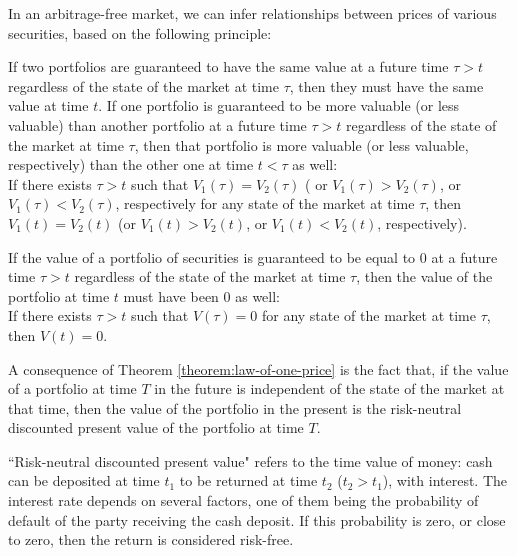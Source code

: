 In an arbitrage-free market, we can infer relationships between prices of
    various securities, based on the following principle:
\begin{theorem}
    \label{theorem:law-of-one-price}
    If two portfolios are guaranteed to have the same value at a future time
        $ \tau > t $ regardless of the state of the market at time $ \tau $,
        then they must have the same value at time $ t $.
    If one portfolio is guaranteed to be more valuable (or less valuable) than
        another portfolio at a future time $ \tau > t $ regardless of the state
        of the market at time $ \tau $, then that portfolio is more valuable
        (or less valuable, respectively) than the other one at time $ t < \tau $
        as well: \\
    If there exists $ \tau > t $ such that $ V_1(\tau) = V_2(\tau) $ ( or
        $ V_1(\tau) > V_2(\tau) $, or $ V_1(\tau) < V_2(\tau) $, respectively
        for any state of the market at time $ \tau $, then $ V_1(t) = V_2(t) $
        (or $ V_1(t) > V_2(t) $, or $ V_1(t) < V_2(t) $, respectively).
\end{theorem}

\begin{corollary}
    If the value of a portfolio of securities is guaranteed to be equal to
        0 at a future time $ \tau > t $ regardless of the state of the market
        at time $ \tau $, then the value of the portfolio at time $ t $ must
        have been 0 as well: \\
    If there exists $ \tau > t $ such that $ V(\tau) = 0 $ for any state of the
        market at time $ \tau $, then $ V(t) = 0 $.
\end{corollary}

A consequence of Theorem \ref{theorem:law-of-one-price} is the fact that, if the
    value of a portfolio at time $ T $ in the future is independent of the state
    of the market at that time, then the value of the portfolio in the present
    is the risk-neutral discounted present value of the portfolio at time $ T $.

``Risk-neutral discounted present value" refers to the time value of money: cash
    can be deposited at time $ t_1 $ to be returned at time $ t_2 $
    ($ t_2 > t_1 $), with interest.
The interest rate depends on several factors, one of them being the probability
    of default of the party receiving the cash deposit.
If this probability is zero, or close to zero, then the return is considered
    risk-free.

